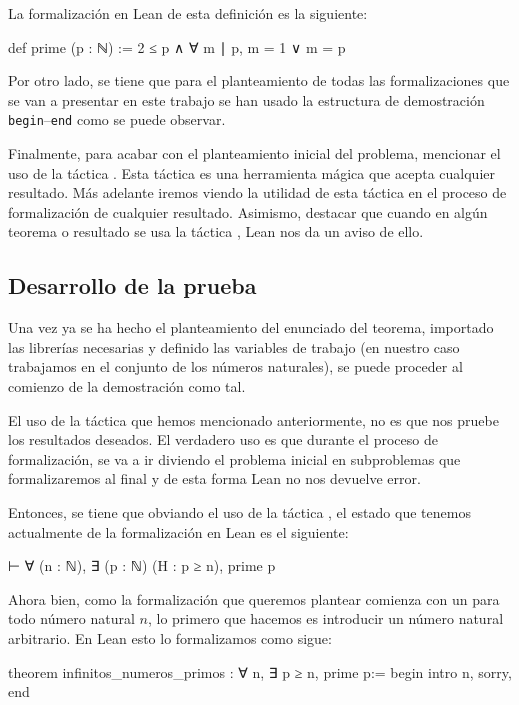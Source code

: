 La formalización en Lean de esta definición es la siguiente:
\begin{leancode}
def prime (p : ℕ) := 2 ≤ p ∧ ∀ m ∣ p, m = 1 ∨ m = p
\end{leancode}

Por otro lado, se tiene que para el planteamiento de todas las
formalizaciones que se van a presentar en este trabajo se han usado la
estructura de demostración \texttt{begin}--\texttt{end} como se puede
observar.

Finalmente, para acabar con el planteamiento inicial del problema,
mencionar el uso de la táctica . Esta táctica es
una herramienta mágica que acepta cualquier resultado. Más adelante
iremos viendo la utilidad de esta táctica en el proceso de formalización
de cualquier resultado.  Asimismo, destacar que cuando en algún teorema
o resultado se usa la táctica , Lean nos da un
aviso de ello.

\subsection{Desarrollo de la prueba}

Una vez ya se ha hecho el planteamiento del enunciado del teorema,
importado las librerías necesarias y definido las variables de trabajo
(en nuestro caso trabajamos en el conjunto de los números naturales), se
puede proceder al comienzo de la demostración como tal.

El uso de la táctica  que hemos mencionado
anteriormente, no es que nos pruebe los resultados deseados. El
verdadero uso es que durante el proceso de formalización, se va a ir
diviendo el problema inicial en subproblemas que formalizaremos al final
y de esta forma Lean no nos devuelve error.

Entonces, se tiene que obviando el uso de la táctica
, el estado que tenemos actualmente de la
formalización en Lean es el siguiente:
\begin{leancode}
⊢ ∀ (n : ℕ), ∃ (p : ℕ) (H : p ≥ n), prime p
\end{leancode}

Ahora bien, como la formalización que queremos plantear comienza con un
para todo número natural \(n\), lo primero que hacemos es introducir un
número natural arbitrario. En Lean esto lo formalizamos como sigue:
\begin{leancode}
theorem infinitos_numeros_primos : ∀ n, ∃ p ≥ n, prime p:=
begin
  intro n,
  sorry,
end
\end{leancode}

